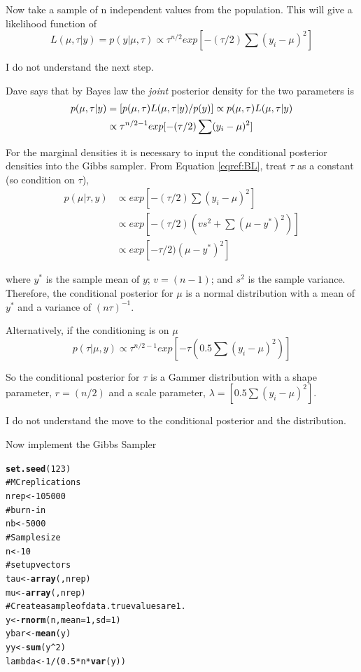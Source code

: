 \documentclass[12pt, a4paper, oneside]{article}\usepackage{graphicx, color}
\makeatletter
\newcommand{\hlfunctioncall}[1]{\textcolor[rgb]{0.501960784313725,0,0.329411764705882}{\textbf{#1}}}%
\newcommand{\hlcomment}[1]{\textcolor[rgb]{0.180392156862745,0.6,0.341176470588235}{#1}}%
\newenvironment{kframe}{%
 \def\at@end@of@kframe{}%
 \ifinner\ifhmode%
  \def\at@end@of@kframe{\end{minipage}}%
  \begin{minipage}{\columnwidth}%
 \fi\fi%
 \def\FrameCommand##1{\hskip\@totalleftmargin \hskip-\fboxsep
 \colorbox{shadecolor}{##1}\hskip-\fboxsep
     \hskip-\linewidth \hskip-\@totalleftmargin \hskip\columnwidth}%
 \MakeFramed {\advance\hsize-\width
   \@totalleftmargin\z@ \linewidth\hsize
   \@setminipage}}%
 {\par\unskip\endMakeFramed%
 \at@end@of@kframe}
\newenvironment{knitrout}{}{} %
\makeatother
\begin{document}
Now take a sample of n independent values from the population.  This will give a likelihood function of
\begin{equation}
L(\mu, \tau | y) = p(y | \mu, \tau) \propto \tau^{n/2} exp[-(\tau/2) \sum(y_i - \mu)^2]
\end{equation}

I do not understand the next step.  

Dave says that by Bayes law the \emph{joint} posterior density for the two parameters is
\begin{align}{\label{eqref:BL}}
p(\mu, \tau | y) &= [p(\mu, \tau)L(\mu, \tau | y)/ p(y)] \propto p(\mu, \tau)L(\mu, \tau |y)\\
                 &\propto \tau^{n/2 -1}exp[-(\tau/2)\sum(y_i - \mu)^2]
\end{align}

For the marginal densities it is necessary to input the conditional posterior densities into the Gibbs sampler.  
From Equation \ref{eqref:BL}, treat $\tau$ as a constant (so condition on $\tau$), 
\begin{align}
p(\mu | \tau, y) &\propto exp[-(\tau/2)\sum(y_i - \mu)^2]\\
&\propto exp[-(\tau/2) (vs^2 + \sum(\mu - y^*)^2)]\\
&\propto exp[-\tau/2)(\mu - y^*)^2]
\end{align}

where $y^*$ is the sample mean of $y$; $v = (n - 1)$; and $s^2$ is the sample variance. Therefore, the conditional posterior for $\mu$ is a normal distribution with a mean of $y^*$ and a variance of $(n\tau)^{-1}$.

Alternatively, if the conditioning is on $\mu$ 
\begin{equation}
p(\tau | \mu, y) \propto \tau^{n/2 -1}exp[-\tau(0.5\sum(y_i - \mu)^2)]
\end{equation}

So the conditional posterior for $\tau$ is a Gammer distribution with a shape parameter, $r = (n/2)$ and a scale parameter, $\lambda = [0.5\sum(y_i - \mu)^2]$. 

I do not understand the move to the conditional posterior and the distribution. 

Now implement the Gibbs Sampler
\begin{knitrout}
\color{fgcolor}\begin{kframe}
\begin{alltt}
\hlfunctioncall{set.seed}(123)
\hlcomment{# MC replications}
nrep <- 105000
\hlcomment{# burn-in}
nb <- 5000
\hlcomment{# Sample size}
n <- 10
\hlcomment{# set up vectors}
tau <- \hlfunctioncall{array}(, nrep)
mu <- \hlfunctioncall{array}(, nrep)
\hlcomment{# Create a sample of data.  true values are 1.}
y <- \hlfunctioncall{rnorm}(n, mean = 1, sd = 1)
ybar <- \hlfunctioncall{mean}(y)
yy <- \hlfunctioncall{sum}(y^2)
lambda <- 1/(0.5 * n * \hlfunctioncall{var}(y))
\end{alltt}
\end{kframe}
\end{knitrout}
\end{document}
